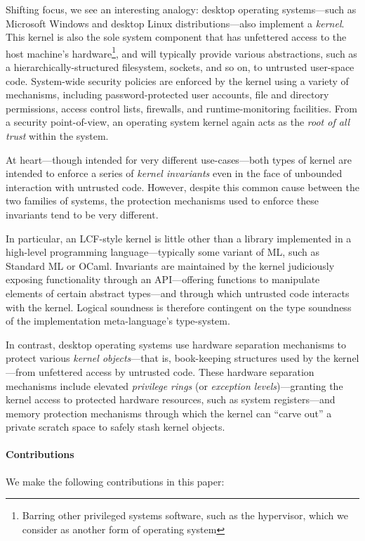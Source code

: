 \documentclass[a4paper, 10pt]{article}
\begin{document}
Shifting focus, we see an interesting analogy: desktop operating systems---such as Microsoft Windows and desktop Linux distributions---also implement a \emph{kernel}.
This kernel is also the sole system component that has unfettered access to the host machine's hardware\footnote{Barring other privileged systems software, such as the hypervisor, which we consider as another form of operating system}, and will typically provide various abstractions, such as a hierarchically-structured filesystem, sockets, and so on, to untrusted user-space code.
System-wide security policies are enforced by the kernel using a variety of mechanisms, including password-protected user accounts, file and directory permissions, access control lists, firewalls, and runtime-monitoring facilities.
From a security point-of-view, an operating system kernel again acts as the \emph{root of all trust} within the system.

At heart---though intended for very different use-cases---both types of kernel are intended to enforce a series of \emph{kernel invariants} even in the face of unbounded interaction with untrusted code.
However, despite this common cause between the two families of systems, the protection mechanisms used to enforce these invariants tend to be very different.

In particular, an LCF-style kernel is little other than a library implemented in a high-level programming language---typically some variant of ML, such as Standard ML or OCaml.
Invariants are maintained by the kernel judiciously exposing functionality through an API---offering functions to manipulate elements of certain abstract types---and through which untrusted code interacts with the kernel.
Logical soundness is therefore contingent on the type soundness of the implementation meta-language's type-system.

In contrast, desktop operating systems use hardware separation mechanisms to protect various \emph{kernel objects}---that is, book-keeping structures used by the kernel---from unfettered access by untrusted code.
These hardware separation mechanisms include elevated \emph{privilege rings} (or \emph{exception levels})---granting the kernel access to protected hardware resources, such as system registers---and memory protection mechanisms through which the kernel can ``carve out'' a private scratch space to safely stash kernel objects.

\paragraph{Contributions}
We make the following contributions in this paper:
\end{document}
